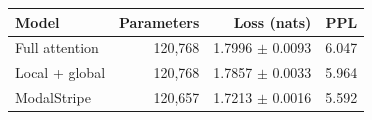 \begin{tabular}{lrrr}\toprule
Model & Parameters & Loss (nats) & PPL\\\midrule
Full attention & 120,768 & 1.7996 $\pm$ 0.0093 & 6.047 \\
Local + global & 120,768 & 1.7857 $\pm$ 0.0033 & 5.964 \\
ModalStripe & 120,657 & 1.7213 $\pm$ 0.0016 & 5.592 \\
\bottomrule\end{tabular}
